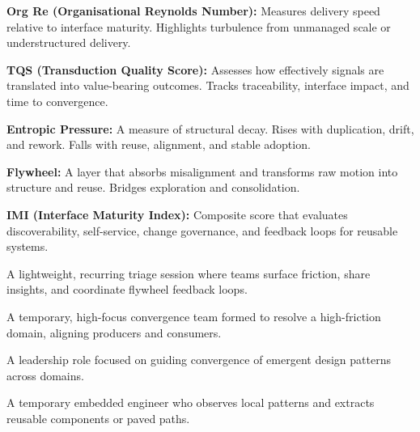 \documentclass[12pt]{article}
\begin{document}
\textbf{Org Re (Organisational Reynolds Number):} Measures delivery speed relative to interface maturity. Highlights turbulence from unmanaged scale or understructured delivery.

\textbf{TQS (Transduction Quality Score):} Assesses how effectively signals are translated into value-bearing outcomes. Tracks traceability, interface impact, and time to convergence.

\textbf{Entropic Pressure:} A measure of structural decay. Rises with duplication, drift, and rework. Falls with reuse, alignment, and stable adoption.

\textbf{Flywheel:} A layer that absorbs misalignment and transforms raw motion into structure and reuse. Bridges exploration and consolidation.

\textbf{IMI (Interface Maturity Index):} Composite score that evaluates discoverability, self-service, change governance, and feedback loops for reusable systems.

\begin{description}[style=nextline]
  \item[Signal Clinic] A lightweight, recurring triage session where teams surface friction, share insights, and coordinate flywheel feedback loops.
  \item[Flow Cell] A temporary, high-focus convergence team formed to resolve a high-friction domain, aligning producers and consumers.
  \item[Pattern Shepherd] A leadership role focused on guiding convergence of emergent design patterns across domains.
  \item[Shadow Integrator] A temporary embedded engineer who observes local patterns and extracts reusable components or paved paths.
\end{description}
\end{document}
